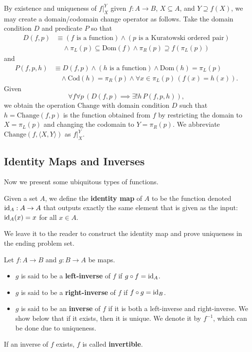 By existence and uniqueness of $f|_{X}^{Y}$ given $f:A\rightarrow B$, $X\subseteq A$, and $Y\supseteq f(X)$, we may create a domain/codomain change operator as follows.
Take the domain condition $D$ and predicate $P$ so that
\begin{align*}
	D(f, p)&\equiv (f\text{ is a function})\land (p\text{ is a Kuratowski ordered pair}) \\
	&\quad\land \pi_{L}(p)\subseteq\textrm{Dom}(f)\land \pi_{R}(p)\supseteq f(\pi_{L}(p))
\end{align*}
and
\begin{align*}
	P(f, p, h)&\equiv D(f, p)\land (h\text{ is a function})\land \textrm{Dom}(h) = \pi_{L}(p) \\
	&\quad\land \textrm{Cod}(h) = \pi_{R}(p) \land \forall x\in\pi_{L}(p)\, (f(x) = h(x)). 
\end{align*}
Given
\[ \forall f\forall p\, (D(f, p)\implies \exists ! h\, P(f, p, h)), \]
we obtain the operation $\textrm{Change}$ with domain condition $D$ such that $h = \textrm{Change}(f, p)$ is the function obtained from $f$ by restricting the domain to $X = \pi_{L}(p)$ and changing the codomain to $Y = \pi_{R}(p)$. 
We abbreviate $\textrm{Change}(f, \langle X, Y\rangle)$ as $f|_{X}^{Y}$. 

\subsection{Identity Maps and Inverses}

Now we present some ubiquitous types of functions. 

\begin{definition}
	Given a set $A$, we define the \textbf{identity map} of $A$ to be the function denoted $\operatorname{id}_{A}:A\rightarrow A$ that outputs exactly the same element that is given as the input: $\operatorname{id}_{A}(x) = x$ for all $x\in A$. 
\end{definition}

\noindent We leave it to the reader to construct the identity map and prove uniqueness in the ending problem set. 

\begin{definition}
	Let $f:A\rightarrow B$ and $g:B\rightarrow A$ be maps.
	\begin{itemize}[itemsep=-0.4ex]
		\item $g$ is said to be a \textbf{left-inverse} of $f$ if $g\circ f = \operatorname{id}_{A}$.
		\item $g$ is said to be a \textbf{right-inverse} of $f$ if $f\circ g = \operatorname{id}_{B}$.
		\item $g$ is said to be an \textbf{inverse} of $f$ if it is both a left-inverse and right-inverse.
		We show below that if it exists, then it is unique.
		We denote it by $f^{-1}$, which can be done due to uniqueness. 
	\end{itemize}
	If an inverse of $f$ exists, $f$ is called \textbf{invertible}. 
\end{definition}

